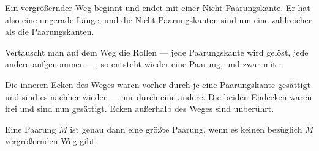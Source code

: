 \begin{merksatz}
\begin{center}
\end{center}

Ein vergrößernder Weg beginnt und endet mit einer Nicht-Paarungskante. Er hat also eine ungerade Länge, und die Nicht-Paarungskanten sind um eine zahlreicher als die Paarungskanten.

Vertauscht man auf dem Weg die Rollen --- jede Paarungskante wird gelöst, jede andere aufgenommen ---, so entsteht wieder eine Paarung, und zwar mit .

Die inneren Ecken des Weges waren vorher durch je eine Paarungskante gesättigt und sind es nachher wieder --- nur durch eine andere. Die beiden Endecken waren frei und sind nun gesättigt. Ecken außerhalb des Weges sind unberührt.
\end{merksatz}

\begin{merksatz}
Eine Paarung $M$ ist genau dann eine größte Paarung, wenn es keinen bezüglich $M$ vergrößernden Weg gibt.
\end{merksatz}

